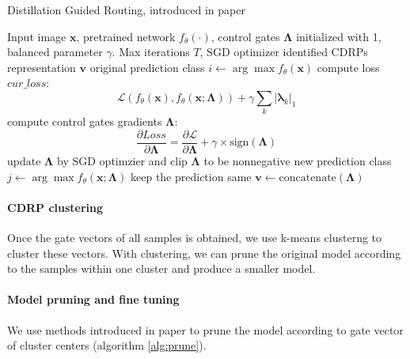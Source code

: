 \documentclass[sigplan,10pt,review]{acmart}\settopmatter{printfolios=true,printccs=false,printacmref=false}
\begin{document}
\begin{algorithm}
	\caption{Distillation Guided Routing, introduced in paper \cite{wang2018interpret}}
	\label{alg:dgr}
	\begin{algorithmic}[1]
		\Require Input image $\boldsymbol{x}$, pretrained network $f_\theta(\cdot)$, control gates $\boldsymbol{\Lambda}$ initialized with 1, balanced parameter $\gamma$. Max iterations $T$, SGD optimizer
		\Ensure identified CDRPs representation $\boldsymbol{v}$
		\State original prediction class $i \gets \arg\max f_\theta(\boldsymbol{x})$
			\State compute loss $cur\_loss$: $$\mathcal{L}\left(f_\theta(\boldsymbol{x}), f_\theta(\boldsymbol{x}; \boldsymbol{\Lambda})\right) + \gamma \sum_k |\boldsymbol{\lambda}_k|_1$$
			\State compute control gates gradients $\boldsymbol{\Lambda}$: $$\frac{\partial Loss}{\partial \boldsymbol{\Lambda}} = \frac{\partial \mathcal{L}}{\partial \boldsymbol{\Lambda}} + \gamma \times \mathrm{sign}(\boldsymbol{\Lambda})$$
			\State update $\boldsymbol{\Lambda}$ by SGD optimzier and clip $\boldsymbol{\Lambda}$ to be nonnegative
			\State new prediction class $j \gets \arg\max f_\theta(\boldsymbol{x};\boldsymbol{\Lambda})$
			 \Comment keep the prediction same
					\State $\boldsymbol{v} \gets \mathrm{concatenate}(\boldsymbol{\Lambda})$
				\EndIf
			\EndIf
		\EndFor		
	\end{algorithmic}
\end{algorithm}

\paragraph{CDRP clustering}

Once the gate vectors of all samples is obtained, we use k-means clusterng to cluster these vectors. With clustering, we can prune the original model according to the samples within one cluster and produce a smaller model. 

\paragraph{Model pruning and fine tuning}

We use methods introduced in paper \cite{LiDongYue} to prune the model according to gate vector of cluster centers (algorithm \ref{alg:prune}).
\end{document}
